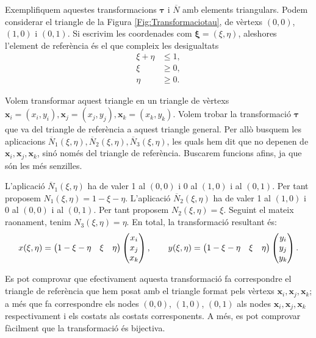 \documentclass{article}
\begin{document}
Exemplifiquem aquestes transformacions $\boldsymbol{\tau}$ i $\overline{N}$ amb elements triangulars. Podem considerar el triangle de la Figura \ref{Fig:Transformaciotau}, de v\`{e}rtexs $(0,0)$, $(1,0)$ i $(0,1)$. Si escrivim les coordenades com $\boldsymbol{\xi}=(\xi,\eta)$, aleshores l'element de refer\`{e}ncia \'{e}s el que compleix les desigualtats
\begin{align*}
\xi+\eta&\leq1,\\
\xi&\geq0,\\
\eta&\geq0.
\end{align*}

Volem transformar aquest triangle en un triangle de v\`{e}rtexs $\boldsymbol{x}_i=(x_i,y_i),\boldsymbol{x}_j=(x_j,y_j),\boldsymbol{x}_k=(x_k,y_k)$. Volem trobar la transformaci\'{o} $\boldsymbol{\tau}$ que va del triangle de refer\`{e}ncia a aquest triangle general. Per all\`{o} busquem les aplicacions $\overline{N}_1(\xi,\eta),\overline{N}_2(\xi,\eta),\overline{N}_3(\xi,\eta)$, les quals hem dit que no depenen de $\boldsymbol{x}_i,\boldsymbol{x}_j,\boldsymbol{x}_k$, sin\'{o} nom\'{e}s del triangle de refer\`{e}ncia. Buscarem funcions afins, ja que s\'{o}n les m\'{e}s senzilles.

L'aplicaci\'{o} $\overline{N}_1(\xi,\eta)$ ha de valer 1 al $(0,0)$ i 0 al $(1,0)$ i al $(0,1)$. Per tant proposem $N_1(\xi,\eta)=1-\xi-\eta$. L'aplicaci\'{o} $\overline{N}_2(\xi,\eta)$ ha de valer 1 al $(1,0)$ i 0 al $(0,0)$ i al $(0,1)$. Per tant proposem $N_2(\xi,\eta)=\xi$. Seguint el mateix raonament, tenim $N_3(\xi,\eta)=\eta$. En total, la transformaci\'{o} resultant \'{e}s:
\[x(\xi,\eta)=\left(\begin{matrix}1-\xi-\eta&\xi&\eta\end{matrix}\right)\left(\begin{matrix}x_i\\x_j\\x_k\end{matrix}\right),\hspace{7mm}y(\xi,\eta)=\left(\begin{matrix}1-\xi-\eta&\xi&\eta\end{matrix}\right)\left(\begin{matrix}y_i\\y_j\\y_k\end{matrix}\right).\]

Es pot comprovar que efectivament aquesta transformaci\'{o} fa correspondre el triangle de refer\`{e}ncia que hem posat amb el triangle format pels v\`{e}rtexs $\boldsymbol{x}_i,\boldsymbol{x}_j,\boldsymbol{x}_k$; a m\'{e}s que fa correspondre els nodes $(0,0)$, $(1,0)$, $(0,1)$ als nodes $\boldsymbol{x}_i,\boldsymbol{x}_j,\boldsymbol{x}_k$ respectivament i els costats als costats corresponents. A m\'{e}s, es pot comprovar f\`{a}cilment que la transformaci\'{o} \'{e}s bijectiva.
\vspace{5mm}
\end{document}
